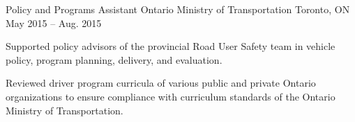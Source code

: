 \begin{cventries}
  \cventry
    {Policy and Programs Assistant } %
    {Ontario Ministry of Transportation } %
    {Toronto, ON} %
    {May 2015 – Aug. 2015} %
    {
      \begin{cvitems} %
        \item {Supported policy advisors of the provincial Road User Safety team in vehicle policy, program planning, delivery, and evaluation.}
        \item {Reviewed driver program curricula of various public and private Ontario organizations to ensure compliance with curriculum standards of the Ontario Ministry of Transportation.}
      \end{cvitems}
    }
  
\end{cventries}

